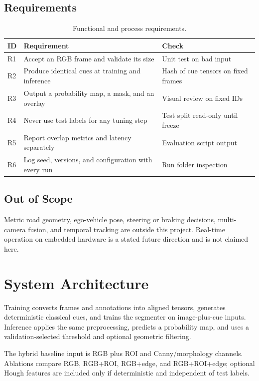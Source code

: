 \documentclass[10pt,a4paper,twocolumn]{article}
\begin{document}
\subsection{Requirements}
\begin{table}[H]
\centering
\caption{Functional and process requirements.}
\footnotesize
\begin{tabularx}{\columnwidth}{|l|X|X|}
\hline
\rowcolor{gray!18}\textbf{ID}&\textbf{Requirement}&\textbf{Check}\\ \hline
R1 & Accept an RGB frame and validate its size & Unit test on bad input\\ \hline
R2 & Produce identical cues at training and inference & Hash of cue tensors on fixed frames\\ \hline
R3 & Output a probability map, a mask, and an overlay & Visual review on fixed IDs\\ \hline
R4 & Never use test labels for any tuning step & Test split read-only until freeze\\ \hline
R5 & Report overlap metrics and latency separately & Evaluation script output\\ \hline
R6 & Log seed, versions, and configuration with every run & Run folder inspection\\ \hline
\end{tabularx}
\end{table}

\subsection{Out of Scope}
Metric road geometry, ego-vehicle pose, steering or braking decisions, multi-camera fusion, and temporal tracking are outside this project. Real-time operation on embedded hardware is a stated future direction and is not claimed here.

\section{System Architecture}\label{sec:arch}
Training converts frames and annotations into aligned tensors, generates deterministic classical cues, and trains the segmenter on image-plus-cue inputs. Inference applies the same preprocessing, predicts a probability map, and uses a validation-selected threshold and optional geometric filtering.

The hybrid baseline input is RGB plus ROI and Canny/morphology channels. Ablations compare RGB, RGB+ROI, RGB+edge, and RGB+ROI+edge; optional Hough features are included only if deterministic and independent of test labels.
\end{document}
